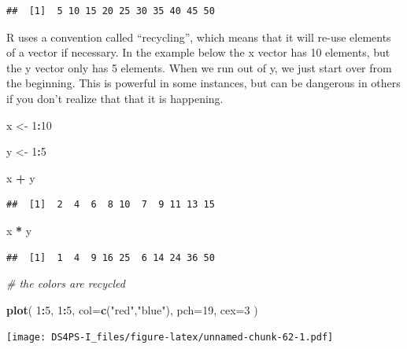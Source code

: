 \documentclass[]{book}
\newenvironment{Shaded}{\begin{snugshade}}{\end{snugshade}}
\newcommand{\CommentTok}[1]{\textcolor[rgb]{0.56,0.35,0.01}{\textit{#1}}}
\newcommand{\DataTypeTok}[1]{\textcolor[rgb]{0.13,0.29,0.53}{#1}}
\newcommand{\DecValTok}[1]{\textcolor[rgb]{0.00,0.00,0.81}{#1}}
\newcommand{\KeywordTok}[1]{\textcolor[rgb]{0.13,0.29,0.53}{\textbf{#1}}}
\newcommand{\NormalTok}[1]{#1}
\newcommand{\OperatorTok}[1]{\textcolor[rgb]{0.81,0.36,0.00}{\textbf{#1}}}
\newcommand{\StringTok}[1]{\textcolor[rgb]{0.31,0.60,0.02}{#1}}
\theoremstyle{definition}
\theoremstyle{definition}
\theoremstyle{definition}
\theoremstyle{remark}
\begin{document}
\begin{verbatim}
##  [1]  5 10 15 20 25 30 35 40 45 50
\end{verbatim}

R uses a convention called ``recycling'', which means that it will
re-use elements of a vector if necessary. In the example below the x
vector has 10 elements, but the y vector only has 5 elements. When we
run out of y, we just start over from the beginning. This is powerful in
some instances, but can be dangerous in others if you don't realize that
that it is happening.

\begin{Shaded}
\begin{Highlighting}[]
\NormalTok{x <-}\StringTok{ }\DecValTok{1}\OperatorTok{:}\DecValTok{10}

\NormalTok{y <-}\StringTok{ }\DecValTok{1}\OperatorTok{:}\DecValTok{5}

\NormalTok{x }\OperatorTok{+}\StringTok{ }\NormalTok{y}
\end{Highlighting}
\end{Shaded}

\begin{verbatim}
##  [1]  2  4  6  8 10  7  9 11 13 15
\end{verbatim}

\begin{Shaded}
\begin{Highlighting}[]
\NormalTok{x }\OperatorTok{*}\StringTok{ }\NormalTok{y}
\end{Highlighting}
\end{Shaded}

\begin{verbatim}
##  [1]  1  4  9 16 25  6 14 24 36 50
\end{verbatim}

\begin{Shaded}
\begin{Highlighting}[]
\CommentTok{# the colors are recycled}

\KeywordTok{plot}\NormalTok{( }\DecValTok{1}\OperatorTok{:}\DecValTok{5}\NormalTok{, }\DecValTok{1}\OperatorTok{:}\DecValTok{5}\NormalTok{, }\DataTypeTok{col=}\KeywordTok{c}\NormalTok{(}\StringTok{"red"}\NormalTok{,}\StringTok{"blue"}\NormalTok{), }\DataTypeTok{pch=}\DecValTok{19}\NormalTok{, }\DataTypeTok{cex=}\DecValTok{3}\NormalTok{ )}
\end{Highlighting}
\end{Shaded}

\texttt{[image: DS4PS-I\_files/figure-latex/unnamed-chunk-62-1.pdf]}
\end{document}
